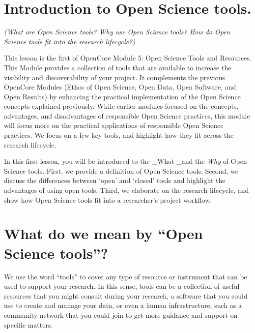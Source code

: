 \documentclass[
  letterpaper,
  DIV=11,
  numbers=noendperiod]{scrreport}
\begin{document}
\hypertarget{introduction-to-open-science-tools.}{%
\section*{Introduction to Open Science
tools.}\label{introduction-to-open-science-tools.}}


\emph{(What are Open Science tools? Why use Open Science tools? How do
Open Science tools fit into the research lifecycle?)}

This lesson is the first of OpenCore Module 5: Open Science Tools and
Resources. This Module provides a collection of tools that are available
to increase the visibility and discoverability of your project. It
complements the previous OpenCore Modules (Ethos of Open Science, Open
Data, Open Software, and Open Results) by enhancing the practical
implementation of the Open Science concepts explained previously. While
earlier modules focused on the concepts, advantages, and disadvantages
of responsible Open Science practices, this module will focus more on
the practical applications of responsible Open Science practices. We
focus on a few key tools, and highlight how they fit across the research
lifecycle.

In this first lesson, you will be introduced to the \_What \_and the
\emph{Why} of Open Science tools. First, we provide a definition of Open
Science tools. Second, we discuss the differences between `open' and
`closed' tools and highlight the advantages of using open tools. Third,
we elaborate on the research lifecycle, and show how Open Science tools
fit into a researcher's project workflow.

\hypertarget{what-do-we-mean-by-open-science-tools}{%
\section*{What do we mean by ``Open Science
tools''?}\label{what-do-we-mean-by-open-science-tools}}


We use the word ``tools'' to cover any type of resource or instrument
that can be used to support your research. In this sense, tools can be a
collection of useful resources that you might consult during your
research, a software that you could use to create and manage your data,
or even a human infrastructure, such as a community network that you
could join to get more guidance and support on specific matters.
\end{document}
